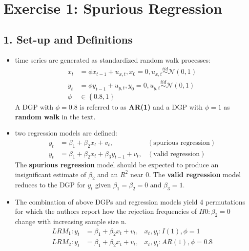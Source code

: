 \documentclass[]{article}
\title{}
\author{}
\begin{document}
\maketitle

\begin{abstract}

\end{abstract}

\section*{Exercise 1: Spurious Regression}
\subsection*{1. Set-up and Definitions}
\begin{itemize} 
	\item time series are generated as standardized random walk processes:
		\begin{align*}
			x_t &= \phi x_{t-1} + u_{x,t}, x_0=0, u_{x,t}  \overset{iid}{\sim}\mathcal{N}(0,1)\\
			y_t &= \phi y_{t-1} + u_{y,t}, y_0=0, u_{y,t}  \overset{iid}{\sim}\mathcal{N}(0,1)\\
			\phi &\in \left\{0.8, 1\right\}
		\end{align*}
		A DGP with $\phi=0.8$ is referred to as \textbf{AR(1)} and a DGP with $\phi=1$ as \textbf{random walk} in the text.
	\item two regression models are defined:
		\begin{align*}
			y_t &= \beta_1 +\beta_2 x_t + v_t, &(\text{spurious regression})\\
			y_t &= \beta_1 + \beta_2 x_t + \beta_3 y_{t-1} + v_t, &(\text{valid regression})
		\end{align*}
		The \textbf{spurious regression} model should be expected to produce an insignificant estimate of $\beta_2$ and an $R^2$ near 0.
		The \textbf{valid regression} model reduces to the DGP for $y_t$ given $\beta_1=\beta_2=0$ and $\beta_3=1$.
	\item The combination of above DGPs and regression models yield 4 permutations for which the authors report how the rejection frequencies of $H0: \beta_2=0$ change with increasing sample size n.
	\begin{align*}
		LRM_1: y_{t} &= \beta_{1} +\beta_{2}x_{t} + v_{t}, &x_t, y_t: I(1), \phi=1\\
		LRM_2: y_{t} &= \beta_{1} +\beta_{2}x_{t} + v_{t}, &x_t, y_t: AR(1), \phi=0.8\\

\end{align*}
\end{itemize}
\end{document}
